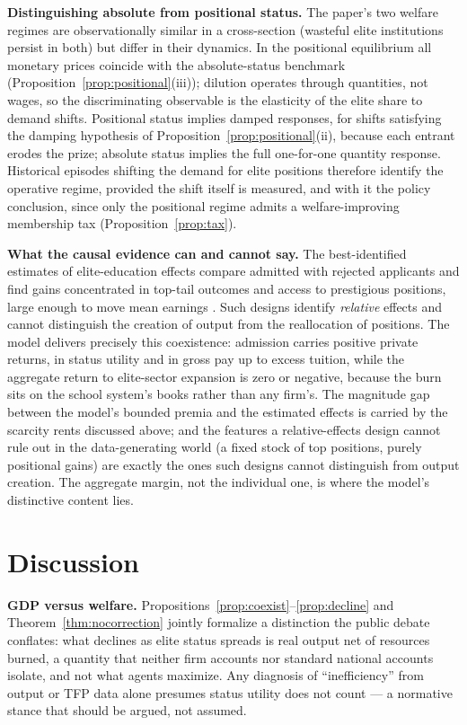 \documentclass[12pt,letterpaper]{article}
\theoremstyle{definition}
\begin{document}
\textbf{Distinguishing absolute from positional status.}
The paper's two welfare regimes are observationally similar in a cross-section (wasteful elite institutions persist in both) but differ in their dynamics.
In the positional equilibrium all monetary prices coincide with the absolute-status benchmark (Proposition~\ref{prop:positional}(iii)); dilution operates through quantities, not wages, so the discriminating observable is the elasticity of the elite share to demand shifts.
Positional status implies damped responses, for shifts satisfying the damping hypothesis of Proposition~\ref{prop:positional}(ii), because each entrant erodes the prize; absolute status implies the full one-for-one quantity response.
Historical episodes shifting the demand for elite positions therefore identify the operative regime, provided the shift itself is measured, and with it the policy conclusion, since only the positional regime admits a welfare-improving membership tax (Proposition~\ref{prop:tax}).

\textbf{What the causal evidence can and cannot say.}
The best-identified estimates of elite-education effects compare admitted with rejected applicants and find gains concentrated in top-tail outcomes and access to prestigious positions, large enough to move mean earnings \citep{zimmerman2019elite,chettydemingfriedman2026}.
Such designs identify \emph{relative} effects and cannot distinguish the creation of output from the reallocation of positions.
The model delivers precisely this coexistence: admission carries positive private returns, in status utility and in gross pay up to excess tuition, while the aggregate return to elite-sector expansion is zero or negative, because the burn sits on the school system's books rather than any firm's.
The magnitude gap between the model's bounded premia and the estimated effects is carried by the scarcity rents discussed above; and the features a relative-effects design cannot rule out in the data-generating world (a fixed stock of top positions, purely positional gains) are exactly the ones such designs cannot distinguish from output creation.
The aggregate margin, not the individual one, is where the model's distinctive content lies.

\section{Discussion}\label{sec:discussion}

\textbf{GDP versus welfare.}
Propositions~\ref{prop:coexist}--\ref{prop:decline} and Theorem~\ref{thm:nocorrection} jointly formalize a distinction the public debate conflates: what declines as elite status spreads is real output net of resources burned, a quantity that neither firm accounts nor standard national accounts isolate, and not what agents maximize.
Any diagnosis of ``inefficiency'' from output or TFP data alone presumes status utility does not count --- a normative stance that should be argued, not assumed.
\end{document}
